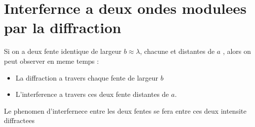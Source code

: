 \documentclass[12pt]{book}
\begin{document}
        \section{Interfernce a deux ondes modulees par la diffraction}
            Si on a deux fente identique de largeur $b \approx \lambda$, chacune et distantes de $a$ , alors on peut observer en meme temps :
            \begin{itemize}
                \item La diffraction a travers chaque fente de largeur $b$
                \item L'interference a travers ces deux fente distantes de $a$.
            \end{itemize}
            Le phenomen d'interfernece entre les deux fentes se fera entre ces deux intensite diffractees \\ 
           
\end{document}
